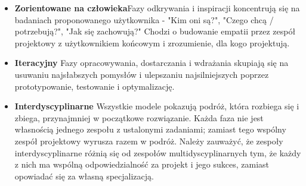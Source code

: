 \documentclass[a4paper,titleauthor]{mwart}
\begin{document}
	\begin{itemize}
		\item \textbf{Zorientowane na człowieka}\newline \newline Fazy odkrywania i inspiracji koncentrują się na badaniach proponowanego użytkownika - "Kim oni są?", "Czego chcą / potrzebują?", "Jak się zachowują?" Chodzi o budowanie empatii przez zespół projektowy z użytkownikiem końcowym i zrozumienie, dla kogo projektują.\newline
		\item \textbf{Iteracyjny} \newline \newline Fazy opracowywania, dostarczania i wdrażania skupiają się na usuwaniu najsłabszych pomysłów i ulepszaniu najsilniejszych poprzez prototypowanie, testowanie i optymalizację.\newline
		\item \textbf{Interdyscyplinarne} \newline \newline Wszystkie modele pokazują podróż, która rozbiega się i zbiega, przynajmniej w początkowe rozwiązanie. Każda faza nie jest własnością jednego zespołu z ustalonymi zadaniami; zamiast tego wspólny zespół projektowy wyrusza razem w podróż. Należy zauważyć, że zespoły interdyscyplinarne różnią się od zespołów multidyscyplinarnych tym, że każdy z nich ma wspólną odpowiedzialność za projekt i jego sukces, zamiast opowiadać się za własną specjalizacją.
	\end{itemize}
	
\end{document}
